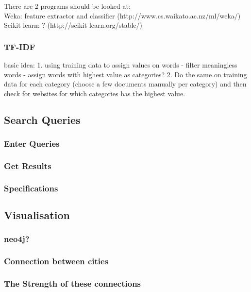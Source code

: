  There are 2 programs should be looked at: \\
Weka: feature extractor and classifier (http://www.cs.waikato.ac.nz/ml/weka/) \\ 
Scikit-learn: ? (http://scikit-learn.org/stable/) %

\subsubsection{TF-IDF}
basic idea: 1. using training data to assign values on words - filter meaningless words - assign words with highest value as categories? 2. Do the same on training data for each category (choose a few documents manually per category) and then check for websites for which categories has the highest value.

\subsection{Search Queries}

\subsubsection{Enter Queries}
\subsubsection{Get Results}
\subsubsection{Specifications}

\subsection{Visualisation}
\subsubsection{neo4j?}

\subsubsection{Connection between cities}
\subsubsection{The Strength of these connections}